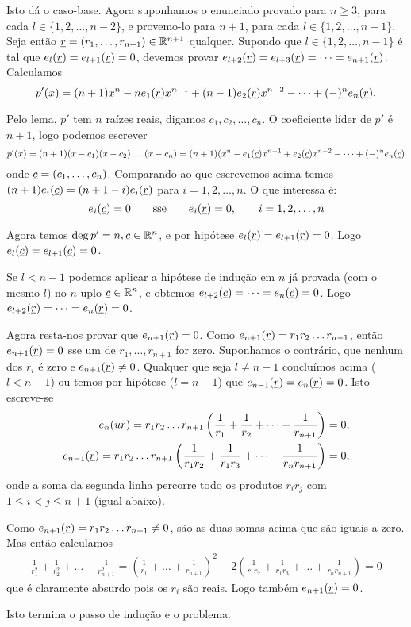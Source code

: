 \documentclass[repertorio-solutions-1.tex]{subfiles}
\renewcommand*{\u}[1]{\ensuremath{\uline{#1}}}
\begin{document}
\begin{solution}
Isto dá o caso-base. Agora suponhamos o enunciado provado para $n\geq 3$,
para cada $l\in\{1,2,\dots,n-2\}$, e provemo-lo para $n+1$,
para cada $l\in\{1,2,\dots,n-1\}$.
Seja então $\u{r}=(r_1,\dots,r_{n+1})\in\mathbb{R}^{n+1}$ qualquer.
Supondo que $l\in\{1,2,\dots,n-1\}$ é tal que $e_l(\u{r})=e_{l+1}(\u{r})=0$,
devemos provar $e_{l+2}(\u{r})=e_{l+3}(\u{r})=\dots=e_{n+1}(\u{r})$.
Calculamos
\begin{equation*}
p'(x)=(n+1)x^n-ne_1(\u{r})x^{n-1}+(n-1)e_2(\u{r})x^{n-2}
-\dots+(-)^ne_n(\u{r}).
\end{equation*}

Pelo lema, $p'$ tem $n$ raízes reais, digamos $c_1,c_2,\dots,c_n$.
O coeficiente líder de $p'$ é $n+1$, logo podemos escrever
\begin{equation*}
p'(x)=(n+1)(x-c_1)(x-c_2)\dots(x-c_n)
=(n+1)(x^n-e_1(\u{c})x^{n-1}+e_2(\u{c})x^{n-2}-\dots+(-)^ne_n(\u{c})
\end{equation*}
onde $\u{c}=(c_1,\dots,c_n)$. Comparando ao que escrevemos acima temos
$(n+1)e_i(\u{c})=(n+1-i)e_i(\u{r})$ para $i=1,2,\dots,n$.
O que interessa é:
\begin{equation*}
e_i(\u{c})=0
\qquad \text{sse} \qquad
e_i(\u{r})=0,
\qquad i=1,2,\dots,n
\end{equation*}

Agora temos $\deg p'=n,\u{c}\in\mathbb{R}^n$, e por hipótese
$e_l(\u{r})=e_{l+1}(\u{r})=0$.
Logo $e_l(\u{c})=e_{l+1}(\u{c})=0$.

Se $l<n-1$ podemos aplicar a hipótese de indução em $n$ já provada
(com o mesmo $l$) no $n$-uplo $\u{c}\in\mathbb{R}^n$, e obtemos
$e_{l+2}(\u{c})=\dots=e_n(\u{c})=0$.
Logo $e_{l+2}(\u{r})=\dots=e_n(\u{r})=0$.

Agora resta-nos provar que $e_{n+1}(\u{r})=0$.
Como $e_{n+1}(\u{r})=r_1r_2\dots r_{n+1}$, então $e_{n+1}(\u{r})=0$
sse um de $r_1,\dots,r_{n+1}$ for zero.
Suponhamos o contrário, que nenhum dos $r_i$ é zero e
$e_{n+1}(\u{r})\neq 0$.
Qualquer que seja $l\neq n-1$ concluímos acima ($l<n-1$) ou temos
por hipótese ($l=n-1$) que $e_{n-1}(\u{r})=e_n(\u{r})=0$.
Isto escreve-se
\begin{align*}
e_n(u{r})=r_1r_2\dots r_{n+1}\left(\frac{1}{r_1}+\frac{1}{r_2}
+\dots+\frac{1}{r_{n+1}}\right)=0, \\
e_{n-1}(\u{r})=r_1r_2\dots r_{n+1}\left(\frac{1}{r_1r_2}+
\frac{1}{r_1r_3}+\dots+\frac{1}{r_nr_{n+1}}\right)=0,
\end{align*}
onde a soma da segunda linha percorre todo os produtos $r_ir_j$
com $1\leq i<j\leq n+1$ (igual abaixo).

Como $e_{n+1}(\u{r})=r_1r_2\dots r_{n+1}\neq 0$, são as duas
somas acima que são iguais a zero.
Mas então calculamos
\begin{align*}
\frac{1}{r_1^2}+\frac{1}{r_2^2}+\dots+\frac{1}{r_{n+1}^2}
=\left(\frac{1}{r_1}+\dots+\frac{1}{r_{n+1}}\right)^2
-2\left(\frac{1}{r_1r_2}+\frac{1}{r_1r_3}
+\dots+\frac{1}{r_nr_{n+1}}\right)=0
\end{align*}
que é claramente absurdo pois os $r_i$ são reais.
Logo também $e_{n+1}(\u{r})=0$.

Isto termina o passo de indução e o problema.
\end{solution}
\end{document}
